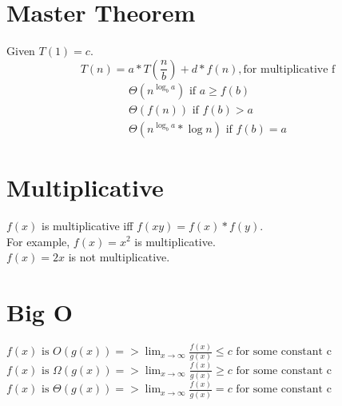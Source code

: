 \documentclass[12pt,twocolumn]{article}
\begin{document}
\section{Master Theorem}
Given $T(1) = c$.\\
\[T(n) = a * T\left(\frac{n}{b}\right) + d*f(n), \mbox{for multiplicative f}\]
\begin{align}
    \Theta(n^{\log_{b} a}) \mbox{ if }a \ge f(b)\\
    \Theta(f(n)) \mbox{ if } f(b) > a\\
    \Theta(n^{\log_{b} a}* \log n) \mbox{ if } f(b) = a
\end{align}
\section{Multiplicative}
$f(x)$ is multiplicative iff $f(xy) =  f(x) * f(y)$.\\
For example, $f(x) = x^2$ is multiplicative.\\
$f(x) = 2x$ is not multiplicative.

\section{Big O}

$ f(x) \mbox{ is } O(g(x)) => \lim_{x \to \infty}{\frac{f(x)}{g(x)}} \le c \mbox{ for some constant c}$\\
$ f(x) \mbox{ is } \Omega(g(x)) => \lim_{x \to \infty}{\frac{f(x)}{g(x)}} \ge c \mbox{ for some constant c}$\\
$ f(x) \mbox{ is } \Theta(g(x)) => \lim_{x \to \infty}{\frac{f(x)}{g(x)}} = c \mbox{ for some constant c}$\\
\end{document}
